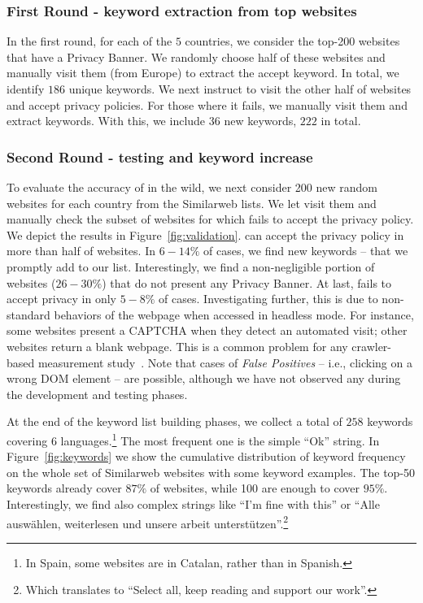 \subsubsection{First Round - keyword extraction from top websites}

In the first round, for each of the $5$ countries, we consider the top-200 websites that have a Privacy Banner. We randomly choose half of these websites and manually visit them (from Europe) to extract the accept keyword. In total, we identify $186$ unique keywords. We next instruct \TOOL to visit the other half of websites and accept privacy policies. For those where it fails, we manually visit them and extract keywords. With this, we include $36$ new keywords, $222$ in total.

\subsubsection{Second Round - testing and keyword increase}

To evaluate the accuracy of \TOOL in the wild, we next consider 200 new random websites for each country from the Similarweb lists. We let \TOOL visit them and manually check the subset of websites for which \TOOL fails to accept the privacy policy. We depict the results in Figure~\ref{fig:validation}. \TOOL can accept the privacy policy in more than half of websites. In $6-14\%$ of cases, we find new keywords -- that we promptly add to our list. Interestingly, we find a non-negligible portion of websites ($26-30\%$) that do not present any Privacy Banner. At last, \TOOL fails to accept privacy in only $5-8\%$ of cases. Investigating further, this is due to non-standard behaviors of the webpage when accessed in headless mode. For instance, some websites present a CAPTCHA when they detect an automated visit; other websites return a blank webpage. This is a common problem for any crawler-based measurement study~\cite{vastel2020fp}. Note that cases of \emph{False Positives} -- i.e., \TOOL clicking on a wrong DOM element -- are possible, although we have not observed any during the development and testing phases. 

At the end of the keyword list building phases, we collect a total of $258$ keywords covering $6$ languages.\footnote{In Spain, some websites are in Catalan, rather than in Spanish.} The most frequent one is the simple ``Ok'' string. In Figure~\ref{fig:keywords} we show the cumulative distribution of keyword frequency on the whole set of Similarweb websites with some keyword examples. The top-50 keywords already cover $87\%$ of websites, while 100 are enough to cover $95\%$.  Interestingly, we find also complex strings like ``I'm fine with this'' or ``Alle auswählen, weiterlesen und unsere arbeit unterstützen''.\footnote{Which translates to ``Select all, keep reading and support our work''.}



